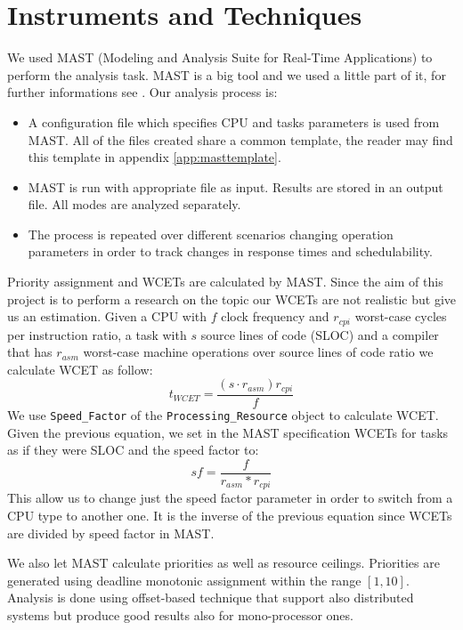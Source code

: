 \documentclass[10pt,a4paper]{report}
\begin{document}
\section{Instruments and Techniques}
We used MAST (Modeling and Analysis Suite for Real-Time Applications) to perform 
the analysis task. MAST is a big tool and we used a little part of it, for 
further informations see \cite{gonzalez01}. 
Our analysis process is: 
\begin{itemize}
    \item A configuration file which specifies CPU and tasks parameters is used
    from MAST. All of the files created share a common template, the reader may
    find this template in appendix \ref{app:masttemplate}.
    \item MAST is run with appropriate file as input. Results are stored in an 
    output file. All modes are analyzed separately.
    \item The process is repeated over different scenarios changing operation 
    parameters in order to track changes in response times and schedulability. 
\end{itemize}
Priority assignment and WCETs are calculated by MAST. Since the aim of this 
project is to perform a research on the topic our WCETs are not realistic but 
give us an estimation. Given a CPU with $f$ clock frequency and $r_{cpi}$ 
worst-case cycles per instruction ratio, a task with $s$ source lines of code 
(SLOC) and a compiler that has $r_{asm}$ worst-case machine operations over 
source lines of code ratio we calculate WCET as follow:
\[
    t_{WCET} = \frac{(s \cdot r_{asm}) r_{cpi}}{f}
\]
We use \texttt{Speed\_Factor} of the \texttt{Processing\_Resource} object to 
calculate WCET. Given the previous equation, we set in the MAST specification 
WCETs for tasks as if they were SLOC and the speed factor to:
\[
    sf = \frac{f}{r_{asm} * r_{cpi}}
\]
This allow us to change just the speed factor parameter in order to switch 
from a CPU type to another one. It is the inverse of the previous equation since
WCETs are divided by speed factor in MAST. 

We also let MAST calculate priorities as well as resource ceilings.
Priorities are generated using deadline monotonic assignment within the range 
$[1, 10]$.
Analysis is done using offset-based technique that support also distributed 
systems but produce good results also for mono-processor ones.
 
\end{document}
